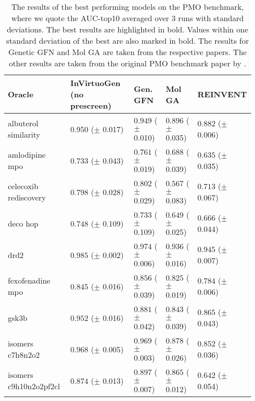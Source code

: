 \begin{table}[ht]
\centering
\caption{The results of the best performing models on the PMO benchmark, where we quote the AUC-top10 averaged over 3 runs with standard deviations. The best results are highlighted in bold. Values within one standard deviation of the best are also marked in bold. The results for Genetic GFN \citep{kim2024geneticguidedgflownetssampleefficient} and Mol GA \citep{tripp2023geneticalgorithmsstrongbaselines} are taken from the respective papers. The other results are taken from the original PMO benchmark paper by \citep{gao2022sampleefficiencymattersbenchmark}.}
\label{tab:prescreen}
\begin{tabularx}{\linewidth}{l|>{}p{2.2cm} Y Y Y }
\toprule
Oracle & InVirtuoGen (no prescreen) & Gen. GFN & Mol GA & REINVENT \\
\midrule
\small{albuterol similarity} & $\mathbf{0.950}$ {\tiny ($\pm$ 0.017)} & $\mathbf{0.949}$ {\tiny ($\pm$ 0.010)} & $0.896$ {\tiny ($\pm$ 0.035)} & $0.882$ {\tiny ($\pm$ 0.006)} \\
\small{amlodipine mpo} & $0.733$ {\tiny ($\pm$ 0.043)} & $\mathbf{0.761}$ {\tiny ($\pm$ 0.019)} & $0.688$ {\tiny ($\pm$ 0.039)} & $0.635$ {\tiny ($\pm$ 0.035)} \\
\small{celecoxib rediscovery} & $\mathbf{0.798}$ {\tiny ($\pm$ 0.028)} & $\mathbf{0.802}$ {\tiny ($\pm$ 0.029)} & $0.567$ {\tiny ($\pm$ 0.083)} & $0.713$ {\tiny ($\pm$ 0.067)} \\
\small{deco hop} & $\mathbf{0.748}$ {\tiny ($\pm$ 0.109)} & $\mathbf{0.733}$ {\tiny ($\pm$ 0.109)} & $\mathbf{0.649}$ {\tiny ($\pm$ 0.025)} & $\mathbf{0.666}$ {\tiny ($\pm$ 0.044)} \\
\small{drd2} & $\mathbf{0.985}$ {\tiny ($\pm$ 0.002)} & $0.974$ {\tiny ($\pm$ 0.006)} & $0.936$ {\tiny ($\pm$ 0.016)} & $0.945$ {\tiny ($\pm$ 0.007)} \\
\small{fexofenadine mpo} & $\mathbf{0.845}$ {\tiny ($\pm$ 0.016)} & $\mathbf{0.856}$ {\tiny ($\pm$ 0.039)} & $\mathbf{0.825}$ {\tiny ($\pm$ 0.019)} & $0.784$ {\tiny ($\pm$ 0.006)} \\
\small{gsk3b} & $\mathbf{0.952}$ {\tiny ($\pm$ 0.016)} & $0.881$ {\tiny ($\pm$ 0.042)} & $0.843$ {\tiny ($\pm$ 0.039)} & $0.865$ {\tiny ($\pm$ 0.043)} \\
\small{isomers c7h8n2o2} & $\mathbf{0.968}$ {\tiny ($\pm$ 0.005)} & $\mathbf{0.969}$ {\tiny ($\pm$ 0.003)} & $0.878$ {\tiny ($\pm$ 0.026)} & $0.852$ {\tiny ($\pm$ 0.036)} \\
\small{isomers c9h10n2o2pf2cl} & $0.874$ {\tiny ($\pm$ 0.013)} & $\mathbf{0.897}$ {\tiny ($\pm$ 0.007)} & $0.865$ {\tiny ($\pm$ 0.012)} & $0.642$ {\tiny ($\pm$ 0.054)} \\

\end{tabularx}
\end{table}
